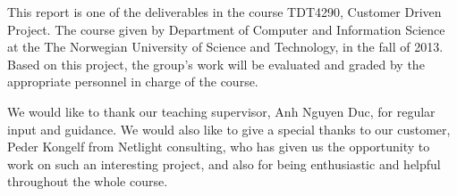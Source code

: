 This report is one of the deliverables in the course TDT4290, Customer Driven Project. The course given by Department of Computer and Information Science at the The Norwegian University of Science and Technology, in the fall of 2013. Based on this project, the group's work will be evaluated and graded by the appropriate personnel in charge of the course. 

We would like to thank our teaching supervisor, Anh Nguyen Duc, for regular input and guidance. 
We would also like to give a special thanks to our customer, Peder  Kongelf from  Netlight consulting, who has given us the opportunity to work on such an interesting project, and also for being enthusiastic and helpful throughout the whole course.